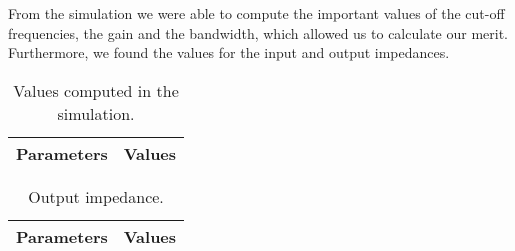 \vspace{10.0cm}

From the simulation we were able to compute the important values of the cut-off frequencies, the gain and the bandwidth, which allowed us to calculate our merit. Furthermore, we found the values for the input and output impedances.

\begin{table}[h]
  \centering
  \begin{tabular}{|l|r|}
    \hline    
    {\bf Parameters} & {\bf Values} \\ \hline
    
  \end{tabular}
  \caption{Values computed in the simulation.}
  \label{tab:s1}
\end{table}

\begin{table}[h]
  \centering
  \begin{tabular}{|l|r|}
    \hline    
    {\bf Parameters} & {\bf Values} \\ \hline
    
  \end{tabular}
  \caption{Output impedance.}
  \label{tab:s2}
\end{table}


